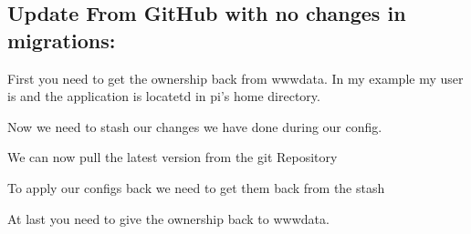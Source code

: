 \documentclass[letterpaper,10pt,english]{sphinxmanual}
\begin{document}
\subsection{Update From GitHub with no changes in migrations:}
\label{\detokenize{masterAdminDoc:update-from-github-with-no-changes-in-migrations}}
First you need to get the ownership back from www\sphinxhyphen{}data.
In my example my user is  and the application is locatetd
in pi’s home directory.
\begin{quote}

\begin{DUlineblock}{0em}
\item[] 
\item[] 
\end{DUlineblock}
\end{quote}

Now we need to stash our changes we have done during our config.
\begin{quote}

\end{quote}

We can now pull the latest version from the git Repository
\begin{quote}

\end{quote}

To apply our configs back we need to get them back from the stash
\begin{quote}

\end{quote}
\begin{description}
\item[{At last you need to give the ownership back to www\sphinxhyphen{}data.}] \leavevmode
{}

\end{description}
\end{document}
